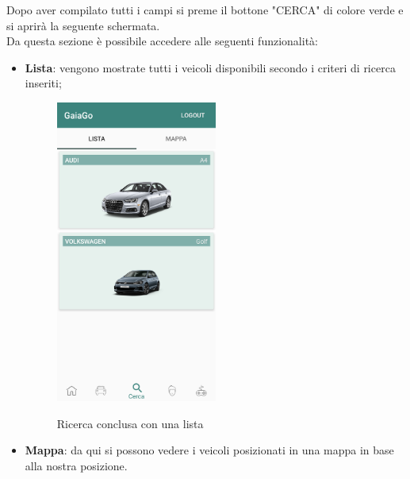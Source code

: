 Dopo aver compilato tutti i campi si preme il bottone "CERCA" di colore verde e si aprirà la seguente schermata.\\
Da questa sezione è possibile accedere alle seguenti funzionalità:
\begin{itemize}
	\item \textbf{Lista}: vengono mostrate tutti i veicoli disponibili secondo i criteri di ricerca inseriti;
	\begin{figure}[H] 
		\centering 
		\includegraphics[width=0.5\textwidth]{res/images/ricerca_conclusa.png}\\
		\caption{Ricerca conclusa con una lista}
		\label{lista}
	\end{figure}
	\pagebreak
	\item \textbf{Mappa}: da qui si possono vedere i veicoli posizionati in una mappa in base alla nostra posizione.
	\begin{figure}[H] 
		\centering 

\end{figure}
\end{itemize}
